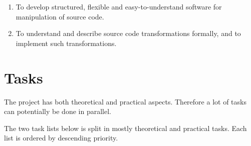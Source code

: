 \documentclass[a4paper,oneside]{article}
\begin{document}
\begin{enumerate}
\item To develop structured, flexible and easy-to-understand software for manipulation of source code.
\item To understand and describe source code transformations formally, and to implement such
  transformations.
\end{enumerate}


\section{Tasks}
The project has both theoretical and practical aspects. Therefore a lot of tasks can potentially be
done in parallel.

The two task lists below is split in mostly theoretical and practical tasks. Each list is ordered by
descending priority.
\end{document}
